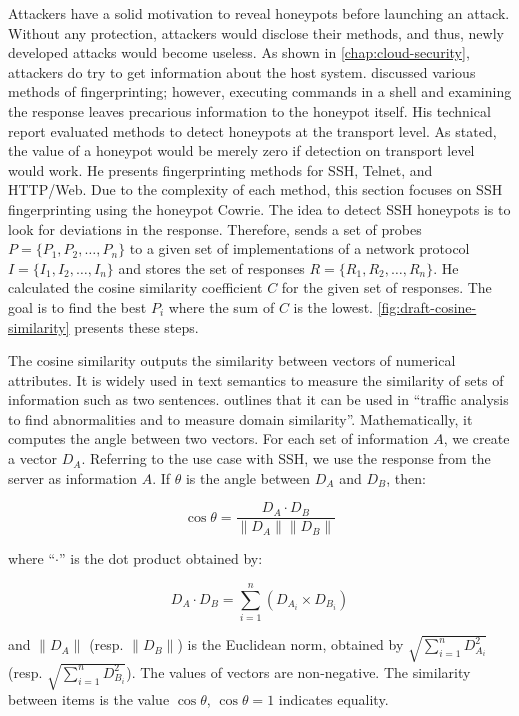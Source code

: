 Attackers have a solid motivation to reveal honeypots before launching an attack.
Without any protection, attackers would disclose their methods, and thus, newly developed attacks would become useless.
As shown in \autoref{chap:cloud-security}, attackers do try to get information about the host system.
\citet{vetterl2020} discussed various methods of fingerprinting; however, executing commands in a shell and examining the response leaves precarious information to the honeypot itself.
His technical report evaluated methods to detect honeypots at the transport level.
As stated, the value of a honeypot would be merely zero if detection on transport level would work.
He presents fingerprinting methods for SSH, Telnet, and HTTP/Web.
Due to the complexity of each method, this section focuses on SSH fingerprinting using the honeypot Cowrie.
The idea to detect SSH honeypots is to look for deviations in the response.
Therefore, \citet{vetterl2020} sends a set of probes $P = \{P_1, P_2, \dots, P_n\}$ to a given set of implementations of a network protocol $I = \{I_1, I_2, \dots, I_n\}$ and stores the set of responses $R = \{R_1, R_2, \dots, R_n\}$.
He calculated the cosine similarity coefficient $C$ for the given set of responses.
The goal is to find the best $P_i$ where the sum of $C$ is the lowest.
\autoref{fig:draft-cosine-similarity} presents these steps.

The cosine similarity outputs the similarity between vectors of numerical attributes.
It is widely used in text semantics to measure the similarity of sets of information such as two sentences.
\citet{vetterl2020} outlines that it can be used in \enquote{traffic analysis to find abnormalities and to measure domain similarity}.
Mathematically, it computes the angle between two vectors.
For each set of information $A$, we create a vector $D_A$.
Referring to the use case with SSH, we use the response from the server as information $A$.
If $\theta$ is the angle between $D_A$ and $D_B$, then:

\begin{equation} \label{eq:cosine-similarity}
    \cos \theta = \frac{D_A \cdot D_B}{\|D_A\| \|D_B\|}
\end{equation}

where \enquote{$\cdot$} is the dot product obtained by:

\begin{equation}
    D_A \cdot D_B = \sum_{i=1}^{n} (D_{A_i} \times D_{B_i})
\end{equation}

and $\|D_A\|$ (resp. $\|D_B\|$) is the Euclidean norm, obtained by $\sqrt{\sum_{i=1}^{n} D_{A_i}^2}$ (resp. $\sqrt{\sum_{i=1}^{n} D_{B_i}^2}$).
The values of vectors are non-negative.
The similarity between items is the value $\cos \theta$, $\cos \theta = 1$ indicates equality.

